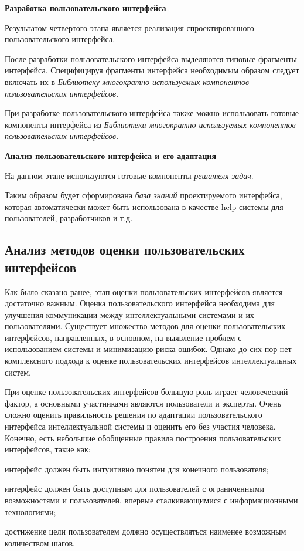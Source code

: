 \textbf{Разработка пользовательского интерфейса}

Результатом четвертого этапа является реализация спроектированного пользовательского интерфейса. 

После разработки пользовательского интерфейса выделяются типовые
фрагменты интерфейса. Специфицируя фрагменты интерфейса необходимым образом следует включать их в \textit{Библиотеку многократно используемых компонентов пользовательских интерфейсов}.

При разработке пользовательского интерфейса также можно использовать готовые компоненты интерфейса из \textit{Библиотеки многократно используемых компонентов пользовательских интерфейсов}.

\textbf{Анализ пользовательского интерфейса и его адаптация}

На данном этапе используются готовые компоненты \textit{решателя задач}.

Таким образом будет сформирована \textit{база знаний} проектируемого интерфейса, которая автоматически может быть использована в качестве help-системы для пользователей, разработчиков и т.д.

\subsection{Анализ методов оценки пользовательских интерфейсов}
\label{sec_UI_analisys}

Как было сказано ранее, этап оценки пользовательских интерфейсов является достаточно важным.
Оценка пользовательского интерфейса необходима для улучшения коммуникации между интеллектуальными системами и их пользователями. Существует множество методов для оценки пользовательских интерфейсов, направленных, в основном, на выявление проблем с использованием системы и минимизацию риска ошибок. Однако до сих пор нет комплексного подхода к оценке пользовательских интерфейсов интеллектуальных систем.

При оценке пользовательских интерфейсов большую роль играет человеческий фактор, а основными участниками являются пользователи и эксперты. Очень сложно оценить правильность решения по адаптации пользовательского интерфейса интеллектуальной системы и оценить его без участия человека. Конечно, есть небольшие обобщенные правила построения пользовательских интерфейсов, такие как:

\begin{textitemize}
	\item интерфейс должен быть интуитивно понятен для конечного пользователя;
	\item интерфейс должен быть доступным для пользователей с ограниченными возможностями и пользователей, впервые сталкивающимися с информационными технологиями;
	\item достижение цели пользователем должно осуществляться наименее возможным количеством шагов.
\end{textitemize}


